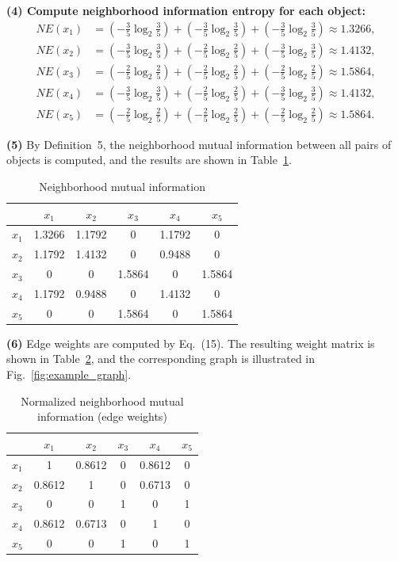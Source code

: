 \documentclass[lettersize,journal]{IEEEtran}
\begin{document}
\textbf{(4) Compute neighborhood information entropy for each object:}
\begin{align*}
NE(x_{1}) &= (-\tfrac{3}{5}\log_{2}\tfrac{3}{5}) + (-\tfrac{3}{5}\log_{2}\tfrac{3}{5}) + (-\tfrac{3}{5}\log_{2}\tfrac{3}{5}) \approx 1.3266,\\
NE(x_{2}) &= (-\tfrac{3}{5}\log_{2}\tfrac{3}{5}) + (-\tfrac{2}{5}\log_{2}\tfrac{2}{5}) + (-\tfrac{3}{5}\log_{2}\tfrac{3}{5}) \approx 1.4132,\\
NE(x_{3}) &= (-\tfrac{2}{5}\log_{2}\tfrac{2}{5}) + (-\tfrac{2}{5}\log_{2}\tfrac{2}{5}) + (-\tfrac{2}{5}\log_{2}\tfrac{2}{5}) \approx 1.5864,\\
NE(x_{4}) &= (-\tfrac{3}{5}\log_{2}\tfrac{3}{5}) + (-\tfrac{2}{5}\log_{2}\tfrac{2}{5}) + (-\tfrac{3}{5}\log_{2}\tfrac{3}{5}) \approx 1.4132,\\
NE(x_{5}) &= (-\tfrac{2}{5}\log_{2}\tfrac{2}{5}) + (-\tfrac{2}{5}\log_{2}\tfrac{2}{5}) + (-\tfrac{2}{5}\log_{2}\tfrac{2}{5}) \approx 1.5864.
\end{align*}

\textbf{(5)} By Definition~5, the neighborhood mutual information between all pairs of objects is
computed, and the results are shown in Table~\ref{tab:nmi}.

\begin{table}[!t]
\caption{Neighborhood mutual information}
\label{tab:nmi}
\centering
\begin{tabular}{cccccc}
\toprule
& \(x_{1}\) & \(x_{2}\) & \(x_{3}\) & \(x_{4}\) & \(x_{5}\) \\
\midrule
\(x_{1}\) & 1.3266 & 1.1792 & 0 & 1.1792 & 0 \\
\(x_{2}\) & 1.1792 & 1.4132 & 0 & 0.9488 & 0 \\
\(x_{3}\) & 0 & 0 & 1.5864 & 0 & 1.5864 \\
\(x_{4}\) & 1.1792 & 0.9488 & 0 & 1.4132 & 0 \\
\(x_{5}\) & 0 & 0 & 1.5864 & 0 & 1.5864 \\
\bottomrule
\end{tabular}
\end{table}

\textbf{(6)} Edge weights are computed by Eq.~(15). The resulting weight matrix is shown in
Table~\ref{tab:weights}, and the corresponding graph is illustrated in Fig.~\ref{fig:example_graph}.

\begin{table}[!t]
\caption{Normalized neighborhood mutual information (edge weights)}
\label{tab:weights}
\centering
\begin{tabular}{cccccc}
\toprule
& \(x_{1}\) & \(x_{2}\) & \(x_{3}\) & \(x_{4}\) & \(x_{5}\) \\
\midrule
\(x_{1}\) & 1 & 0.8612 & 0 & 0.8612 & 0 \\
\(x_{2}\) & 0.8612 & 1 & 0 & 0.6713 & 0 \\
\(x_{3}\) & 0 & 0 & 1 & 0 & 1 \\
\(x_{4}\) & 0.8612 & 0.6713 & 0 & 1 & 0 \\
\(x_{5}\) & 0 & 0 & 1 & 0 & 1 \\
\bottomrule
\end{tabular}
\end{table}
\end{document}
